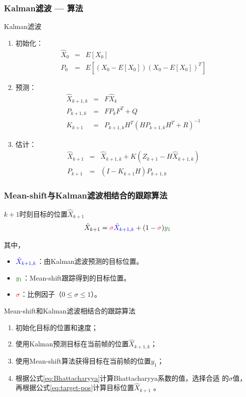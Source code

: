 \documentclass[xcolor=svgnames,serif,table]{beamer}
\begin{document}
\begin{frame}
  \frametitle{Kalman滤波 --- 算法}
  \begin{exampleblock}{Kalman滤波}
    \scriptsize
    \begin{enumerate}[(S1)]
    \item 初始化：
    \begin{eqnarray*}
      \hat{X}_0&=&E[X_0]\\
      P_0&=&E[(X_0-E[X_0])(X_0-E[X_0])^{T}]
    \end{eqnarray*}
    \item 预测：
    \begin{eqnarray*}
      \hat{X}_{k+1,k}&=&F \hat{X}_{k}\\ 
      P_{k+1,k}&=&F P_{k}F^{T}+Q\\
      K_{k+1}&=&P_{k+1,k}H^{T}(H P_{k+1,k}H^{T}+R)^{-1}
    \end{eqnarray*}
    \item 估计：
    \begin{eqnarray*}
      \hat{X}_{k+1}&=&\hat{X}_{k+1,k}+K(Z_{k+1}-H\hat{X}_{k+1,k})\\
      P_{k+1}&=&(I-K_{k+1}H)P_{k+1,k}
    \end{eqnarray*}
    \end{enumerate}
  \end{exampleblock}
\end{frame}

\begin{frame}[allowframebreaks]
  \frametitle{Mean-shift与Kalman滤波相结合的跟踪算法}
  \begin{block}{$k+1$时刻目标的位置$\hat{X}_{k+1}$}
    \begin{equation}
  \label{eq:target-pos}
  \hat{X}_{k+1}=\textcolor{red}{\sigma}\textcolor{blue}{\hat{X}_{k+1,k}}+(1-\textcolor{red}{\sigma})\textcolor{black!60!green}{y_1}
\end{equation}
\end{block}
其中，
\begin{itemize}
\item $\textcolor{blue}{\hat{X}_{k+1,k}}$：由Kalman滤波预测的目标位置。
\item $\textcolor{black!60!green}{y_1}$：Mean-shift跟踪得到的目标位置。
\item $\textcolor{red}{\sigma}$：比例因子（$0 \le \sigma \le 1$）。
\end{itemize}

\begin{exampleblock}{Mean-shift和Kalman滤波相结合的跟踪算法}
  \begin{enumerate}[(S1)]
  \item 初始化目标的位置和速度；
  \item 使用Kalman预测目标在当前帧的位置$\hat{X}_{k+1,k}$；
  \item 使用Mean-shift算法获得目标在当前帧的位置$y_1$；
  \item 根据公式\ref{eq:Bhattacharyya}计算Bhattacharyya系数的值，选择合适
    的$\sigma$值，再根据公式\ref{eq:target-pos}计算目标位置$\hat{X}_{k+1}$ 。
  \end{enumerate}
\end{exampleblock}
\end{frame}
\end{document}
